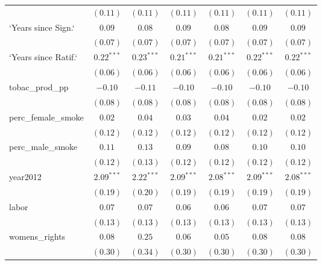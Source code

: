 \begin{table}[!h]
\begin{center}
\begin{tabular}{l c c c c c c }
                        & $(0.11)$     & $(0.11)$     & $(0.11)$     & $(0.11)$     & $(0.11)$     & $(0.11)$     \\
`Years since Sign.`     & $0.09$       & $0.08$       & $0.09$       & $0.08$       & $0.09$       & $0.09$       \\
                        & $(0.07)$     & $(0.07)$     & $(0.07)$     & $(0.07)$     & $(0.07)$     & $(0.07)$     \\
`Years since Ratif.`    & $0.22^{***}$ & $0.23^{***}$ & $0.21^{***}$ & $0.21^{***}$ & $0.22^{***}$ & $0.22^{***}$ \\
                        & $(0.06)$     & $(0.06)$     & $(0.06)$     & $(0.06)$     & $(0.06)$     & $(0.06)$     \\
tobac\_prod\_pp         & $-0.10$      & $-0.11$      & $-0.10$      & $-0.10$      & $-0.10$      & $-0.10$      \\
                        & $(0.08)$     & $(0.08)$     & $(0.08)$     & $(0.08)$     & $(0.08)$     & $(0.08)$     \\
perc\_female\_smoke     & $0.02$       & $0.04$       & $0.03$       & $0.04$       & $0.02$       & $0.02$       \\
                        & $(0.12)$     & $(0.12)$     & $(0.12)$     & $(0.12)$     & $(0.12)$     & $(0.12)$     \\
perc\_male\_smoke       & $0.11$       & $0.13$       & $0.09$       & $0.08$       & $0.10$       & $0.10$       \\
                        & $(0.12)$     & $(0.13)$     & $(0.12)$     & $(0.12)$     & $(0.12)$     & $(0.12)$     \\
year2012                & $2.09^{***}$ & $2.22^{***}$ & $2.09^{***}$ & $2.08^{***}$ & $2.09^{***}$ & $2.08^{***}$ \\
                        & $(0.19)$     & $(0.20)$     & $(0.19)$     & $(0.19)$     & $(0.19)$     & $(0.19)$     \\
labor                   & $0.07$       & $0.07$       & $0.06$       & $0.06$       & $0.07$       & $0.07$       \\
                        & $(0.13)$     & $(0.13)$     & $(0.13)$     & $(0.13)$     & $(0.13)$     & $(0.13)$     \\
womens\_rights          & $0.08$       & $0.25$       & $0.06$       & $0.05$       & $0.08$       & $0.08$       \\
                        & $(0.30)$     & $(0.34)$     & $(0.30)$     & $(0.30)$     & $(0.30)$     & $(0.30)$     \\

\end{tabular}
\end{center}
\end{table}
